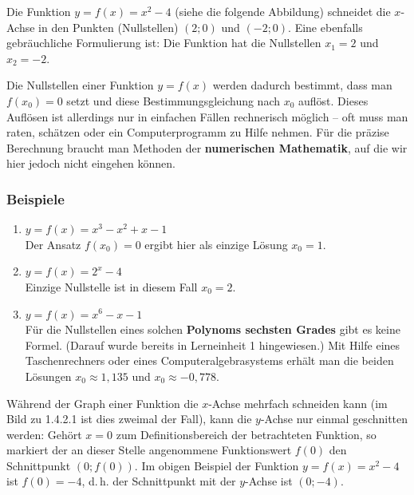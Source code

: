 Die Funktion $y = f(x) = x^2 - 4$ (siehe die folgende Abbildung) schneidet die $x$-Achse in den Punkten (Nullstellen) $(2;0)$ und $(-2;0)$. Eine ebenfalls gebräuchliche Formulierung ist: Die Funktion hat die Nullstellen $x_1 = 2$ und $x_2 = -2$.

\begin{center}
\end{center}

Die Nullstellen einer Funktion $y = f(x)$ werden dadurch bestimmt, dass man $f(x_0) = 0$ setzt und diese Bestimmungsgleichung nach $x_0$ auflöst. Dieses Auflösen ist allerdings nur in einfachen Fällen rechnerisch möglich -- oft muss man raten, schätzen oder ein Computerprogramm zu Hilfe nehmen. Für die präzise Berechnung braucht man Methoden der \textbf{numerischen Mathematik}, auf die wir hier jedoch nicht eingehen können.

\subsubsection{Beispiele}

\begin{enumerate}[label=\alph*)]
  \item $y = f(x) = x^3 - x^2 + x - 1$\\
    Der Ansatz $f(x_0) = 0$ ergibt hier als einzige Lösung $x_0 = 1$.
  \item $y = f(x) = 2^x - 4$\\
    Einzige Nullstelle ist in diesem Fall $x_0 = 2$.
  \item $y = f(x) = x^6 - x - 1$\\
    Für die Nullstellen eines solchen \textbf{Polynoms sechsten Grades} gibt es keine Formel. (Darauf wurde bereits in Lerneinheit 1 hingewiesen.) Mit Hilfe eines Taschenrechners oder eines Computeralgebrasystems erhält man die beiden Lösungen $x_0 \approx 1{,}135$ und $x_0 \approx -0{,}778$.\beispielende
\end{enumerate}

Während der Graph einer Funktion die $x$-Achse mehrfach schneiden kann (im Bild zu 1.4.2.1 ist dies zweimal der Fall), kann die $y$-Achse nur einmal geschnitten werden: Gehört $x = 0$ zum Definitionsbereich der betrachteten Funktion, so markiert der an dieser Stelle angenommene Funktionswert $f(0)$ den Schnittpunkt $(0; f(0))$. Im obigen Beispiel der Funktion $y = f(x) = x^2 - 4$ ist $f(0) = -4$, d.\,h. der Schnittpunkt mit der $y$-Achse ist $(0;-4)$.

